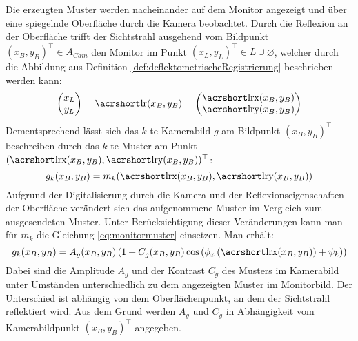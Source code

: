 \noindent
Die erzeugten Muster werden nacheinander auf dem Monitor angezeigt und über eine spiegelnde Oberfläche durch die Kamera beobachtet.
Durch die Reflexion an der Oberfläche trifft der Sichtstrahl ausgehend vom Bildpunkt $(x_B, y_B)^\top \in A_{Cam}$ den Monitor im Punkt $(x_L, y_L)^\top \in L \cup \varnothing$, welcher durch die Abbildung aus Definition \ref{def:deflektometrischeRegistrierung} beschrieben werden kann:
%
\begin{equation}
	\begin{pmatrix}
		x_L \\ 
		y_L
	\end{pmatrix}
	= \acrshortmath{lr}(x_B, y_B) = 
	\begin{pmatrix}
		\acrshortmath{lrx}(x_B, y_B) \\ 
		\acrshortmath{lry}(x_B, y_B)
	\end{pmatrix} 
\end{equation}
%
Dementsprechend lässt sich das $k$-te Kamerabild $g$ am Bildpunkt $(x_B, y_B)^\top$ beschreiben durch das $k$-te Muster am Punkt $(\acrshortmath{lrx}(x_B, y_B), \acrshortmath{lry}(x_B, y_B))^\top$:
%
\begin{equation}
	g_k(x_B, y_B) = m_k(\acrshortmath{lrx}(x_B, y_B), \acrshortmath{lry}(x_B, y_B))
\end{equation}
%
Aufgrund der Digitalisierung durch die Kamera und der Reflexionseigenschaften der Oberfläche verändert sich das aufgenommene Muster im Vergleich zum ausgesendeten Muster.
Unter Berücksichtigung dieser Veränderungen kann man für $m_k$ die Gleichung \ref{eq:monitormuster} einsetzen.
Man erhält:
%
\begin{equation}\label{eq:kamerabild}
	g_k(x_B, y_B) = A_g(x_B, y_B) \left(1 + C_g(x_B, y_B) \cos \left(\phi_{x}\left(\acrshortmath{lrx}(x_B, y_B)\right) + \psi_k\right)\right)
\end{equation}
%
Dabei sind die Amplitude $A_g$ und der Kontrast $C_g$ des Musters im Kamerabild unter Umständen unterschiedlich zu dem angezeigten Muster im Monitorbild.
Der Unterschied ist abhängig von dem Oberflächenpunkt, an dem der Sichtstrahl reflektiert wird.
Aus dem Grund werden $A_g$ und $C_g$ in Abhängigkeit vom Kamerabildpunkt $(x_B, y_B)^\top$ angegeben.


